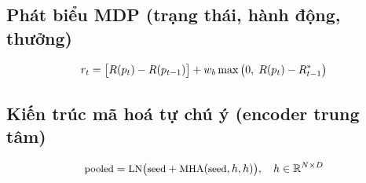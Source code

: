 \documentclass[10pt, conference, a4paper, compsocconf]{IEEEtran}
\begin{document}
\subsection{Phát biểu MDP (trạng thái, hành động, thưởng)}
\begin{equation}\small
\label{eq:reward}
r_t = \big[R(p_t)-R(p_{t-1})\big] + w_b\max\big(0,\;R(p_t)-R^{*}_{t-1}\big)
\end{equation}

\subsection{Kiến trúc mã hoá tự chú ý (encoder trung tâm)}
\begin{equation}\small
\label{eq:pma}
\text{pooled} = \text{LN}\big(\text{seed} + \text{MHA}(\text{seed}, h, h)\big),\quad h\in\mathbb{R}^{N\times D}
\end{equation}
\end{document}
